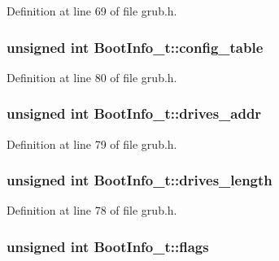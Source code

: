 Definition at line 69 of file grub.\+h.

\hypertarget{structBootInfo__t_a43ae8547b0cea379829329a622d9bc4c}{
\subsubsection[{config\+\_\+table}]{\setlength{\rightskip}{0pt plus 5cm}unsigned int Boot\+Info\+\_\+t\+::config\+\_\+table}}\label{structBootInfo__t_a43ae8547b0cea379829329a622d9bc4c}


Definition at line 80 of file grub.\+h.

\hypertarget{structBootInfo__t_aa355db96d835f264c29a00f15ba126bf}{
\subsubsection[{drives\+\_\+addr}]{\setlength{\rightskip}{0pt plus 5cm}unsigned int Boot\+Info\+\_\+t\+::drives\+\_\+addr}}\label{structBootInfo__t_aa355db96d835f264c29a00f15ba126bf}


Definition at line 79 of file grub.\+h.

\hypertarget{structBootInfo__t_adc0745eb234059fc6eb37d8a6c18e4b4}{
\subsubsection[{drives\+\_\+length}]{\setlength{\rightskip}{0pt plus 5cm}unsigned int Boot\+Info\+\_\+t\+::drives\+\_\+length}}\label{structBootInfo__t_adc0745eb234059fc6eb37d8a6c18e4b4}


Definition at line 78 of file grub.\+h.

\hypertarget{structBootInfo__t_a255b75459b2ed645abe749075f3ca25d}{
\subsubsection[{flags}]{\setlength{\rightskip}{0pt plus 5cm}unsigned int Boot\+Info\+\_\+t\+::flags}}\label{structBootInfo__t_a255b75459b2ed645abe749075f3ca25d}


